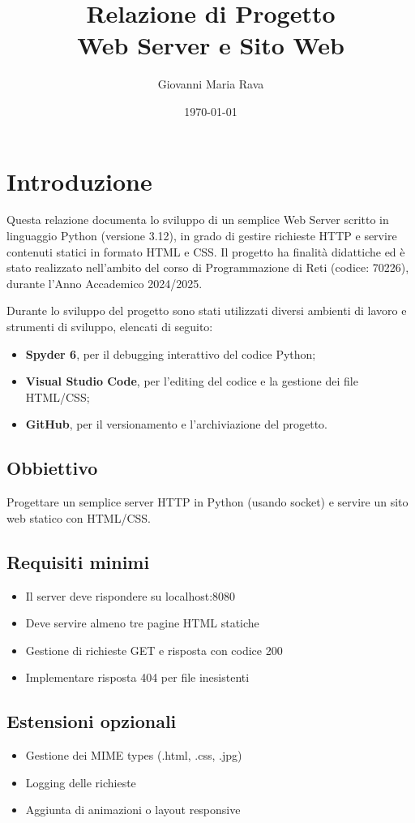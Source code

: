 \documentclass[a4paper,12pt]{report}
\title{Relazione di Progetto \\ Web Server e Sito Web}
\author{Giovanni Maria Rava}
\date{\today}
\begin{document}
\maketitle
\tableofcontents
\chapter{Introduzione}
Questa relazione documenta lo sviluppo di un semplice Web Server scritto in linguaggio Python (versione 3.12), in grado di gestire 
richieste HTTP e servire contenuti statici in formato HTML e CSS. Il progetto ha finalità didattiche ed è stato realizzato nell’ambito
del corso di Programmazione di Reti (codice: 70226), durante l’Anno Accademico 2024/2025.

Durante lo sviluppo del progetto sono stati utilizzati diversi ambienti di lavoro e strumenti di sviluppo, elencati di seguito:
\begin{itemize}
    \item \textbf{Spyder 6}, per il debugging interattivo del codice Python;
    \item \textbf{Visual Studio Code}, per l’editing del codice e la gestione dei file HTML/CSS;
    \item \textbf{GitHub}, per il versionamento e l’archiviazione del progetto.
\end{itemize}
\section{Obbiettivo}
Progettare un semplice server HTTP in Python (usando socket) e servire un sito web statico con HTML/CSS.
\section{Requisiti minimi}
\begin{itemize}
    \item Il server deve rispondere su localhost:8080
    \item Deve servire almeno tre pagine HTML statiche
    \item Gestione di richieste GET e risposta con codice 200
    \item Implementare risposta 404 per file inesistenti 
\end{itemize}
\section{Estensioni opzionali}
\begin{itemize}
    \item Gestione dei MIME types (.html, .css, .jpg)
    \item Logging delle richieste
    \item Aggiunta di animazioni o layout responsive
\end{itemize}
\end{document}
